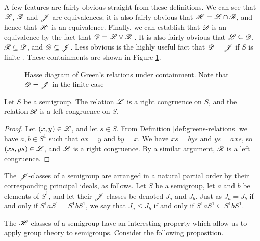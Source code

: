 A few features are fairly obvious straight from these definitions.  We can see
that $\mathscr{L}$, $\mathscr{R}$ and $\mathscr{J}$ are equivalences; it is also fairly obvious that
$\mathscr{H} = \mathscr{L} \cap \mathscr{R}$, and hence that $\mathscr{H}$ is an equivalence.  Finally, we can
establish that $\mathscr{D}$ is an equivalence by the fact that $\mathscr{D} = \mathscr{L} \vee \mathscr{R}$
\cite[\S2.1]{howie}.  It is also fairly obvious that $\mathscr{L} \subseteq \mathscr{D}$, $\mathscr{R}
\subseteq \mathscr{D}$, and $\mathscr{D} \subseteq \mathscr{J}$.  Less obvious is the highly useful fact
that $\mathscr{D} = \mathscr{J}$ if $S$ is
finite \cite[\S2.1]{howie}.  These containments are shown in Figure
\ref{fig:greens-containment}.

\begin{figure}[ht]
  \centering
  \caption[Hasse diagram of Green's relations under containment]{Hasse diagram
    of Green's relations under containment.  Note that $\mathscr{D} = \mathscr{J}$ in the finite
    case}
  \label{fig:greens-containment}
\end{figure}

\begin{proposition}
  \label{prop:greens-as-congs}
  Let $S$ be a semigroup.  The relation $\mathrel{\mathscr{L}}$ is a right congruence on $S$, and
  the relation $\mathrel{\mathscr{R}}$ is a left congruence on $S$.
  \begin{proof}
    Let $(x,y) \in \mathscr{L}$, and let $s \in S$.  From Definition
    \ref{def:greens-relations} we have $a,b \in S^1$ such that $ax=y$ and $by=x$.
    We have $xs = bys$ and $ys = axs$, so $(xs,ys) \in \mathscr{L}$, and $\mathrel{\mathscr{L}}$ is a
    right congruence.  By a similar argument, $\mathrel{\mathscr{R}}$ is a left congruence.
  \end{proof}
\end{proposition}

The $\mathrel{\mathscr{J}}$-classes of a semigroup are arranged in a natural partial order by
their corresponding principal ideals, as follows.  Let $S$ be a semigroup, let
$a$ and $b$ be elements of $S^1$, and let their $\mathrel{\mathscr{J}}$-classes be denoted $J_a$ and $J_b$.
Just as $J_a = J_b$ if and only if $S^1aS^1 = S^1bS^1$, we say that
$J_a \leq J_b$ if and only if $S^1aS^1 \subseteq S^1bS^1$.

The $\mathrel{\mathscr{H}}$-classes of a semigroup have an interesting property which allow us to
apply group theory to semigroups.  Consider the following proposition.

